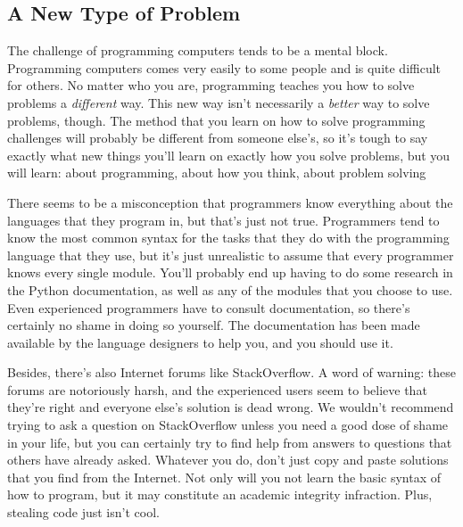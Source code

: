 \subsection{A New Type of Problem}
The challenge of programming computers tends to be a mental block. Programming computers comes very easily to some people and is quite difficult for others. No matter who you are, programming teaches you how to solve problems a \textit{different} way. This new way isn't necessarily a \textit{better} way to solve problems, though. The method that you learn on how to solve programming challenges will probably be different from someone else's, so it's tough to say exactly what new things you'll learn on exactly how you solve problems, but you will learn: about programming, about how you think, about problem solving\par
There seems to be a misconception that programmers know everything about the languages that they program in, but that's just not true. Programmers tend to know the most common syntax for the tasks that they do with the programming language that they use, but it's just unrealistic to assume that every programmer knows every single module. You'll probably end up having to do some research in the Python documentation, as well as any of the modules that you choose to use. Even experienced programmers have to consult documentation, so there's certainly no shame in doing so yourself. The documentation has been made available by the language designers to help you, and you should use it.\par
Besides, there's also Internet forums like StackOverflow. A word of warning: these forums are notoriously harsh, and the experienced users seem to believe that they're right and everyone else's solution is dead wrong. We wouldn't recommend trying to ask a question on StackOverflow unless you need a good dose of shame in your life, but you can certainly try to find help from answers to questions that others have already asked. Whatever you do, don't just copy and paste solutions that you find from the Internet. Not only will you not learn the basic syntax of how to program, but it may constitute an academic integrity infraction. Plus, stealing code just isn't cool.\par
